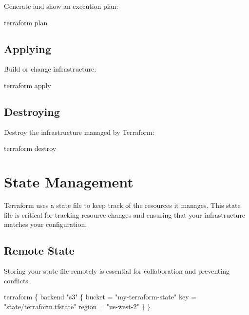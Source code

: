 \documentclass[
  letterpaper,
  DIV=11,
  numbers=noendperiod]{scrreprt}
\newenvironment{Shaded}{\begin{snugshade}}{\end{snugshade}}
\newcommand{\ExtensionTok}[1]{\textcolor[rgb]{0.00,0.23,0.31}{#1}}
\newcommand{\NormalTok}[1]{\textcolor[rgb]{0.00,0.23,0.31}{#1}}
\begin{document}
Generate and show an execution plan:

\begin{Shaded}
\begin{Highlighting}[]
\ExtensionTok{terraform}\NormalTok{ plan}
\end{Highlighting}
\end{Shaded}

\subsection{Applying}\label{applying}

Build or change infrastructure:

\begin{Shaded}
\begin{Highlighting}[]
\ExtensionTok{terraform}\NormalTok{ apply}
\end{Highlighting}
\end{Shaded}

\subsection{Destroying}\label{destroying}

Destroy the infrastructure managed by Terraform:

\begin{Shaded}
\begin{Highlighting}[]
\ExtensionTok{terraform}\NormalTok{ destroy}
\end{Highlighting}
\end{Shaded}

\section{State Management}\label{state-management}

Terraform uses a state file to keep track of the resources it manages.
This state file is critical for tracking resource changes and ensuring
that your infrastructure matches your configuration.

\subsection{Remote State}\label{remote-state}

Storing your state file remotely is essential for collaboration and
preventing conflicts.

\begin{Shaded}
\begin{Highlighting}[]
\NormalTok{terraform \{}
\NormalTok{  backend "s3" \{}
\NormalTok{    bucket = "my{-}terraform{-}state"}
\NormalTok{    key    = "state/terraform.tfstate"}
\NormalTok{    region = "us{-}west{-}2"}
\NormalTok{  \}}
\NormalTok{\}}
\end{Highlighting}
\end{Shaded}
\end{document}
